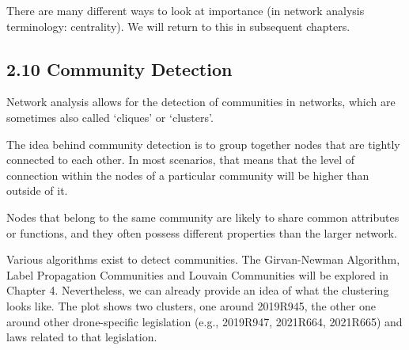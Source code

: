     There are many different ways to look at importance (in network analysis
terminology: centrality). We will return to this in subsequent chapters.

    \hypertarget{community-detection}{%
\subsection{2.10 Community Detection}\label{community-detection}}

Network analysis allows for the detection of communities in networks,
which are sometimes also called `cliques' or `clusters'.

The idea behind community detection is to group together nodes that are
tightly connected to each other. In most scenarios, that means that the
level of connection within the nodes of a particular community will be
higher than outside of it.

Nodes that belong to the same community are likely to share common
attributes or functions, and they often possess different properties
than the larger network.

Various algorithms exist to detect communities. The Girvan-Newman
Algorithm, Label Propagation Communities and Louvain Communities will be
explored in Chapter 4. Nevertheless, we can already provide an idea of
what the clustering looks like. The plot shows two clusters, one around
2019R945, the other one around other drone-specific legislation (e.g.,
2019R947, 2021R664, 2021R665) and laws related to that legislation.

